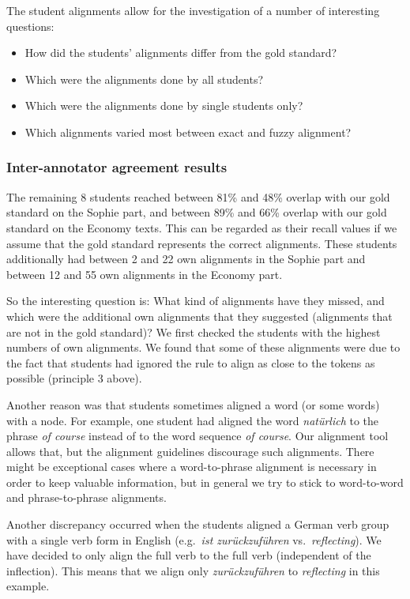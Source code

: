 \documentclass[output=paper]{LSP/langsci}
\begin{document}
The student alignments allow for the investigation of a number of interesting questions: 

\begin{itemize}
\item How did the students' alignments differ from the gold standard? 
\item Which were the alignments done by all students? 
\item Which were the alignments done by single students only? 
\item Which alignments varied most between exact and fuzzy alignment?
\end{itemize}

\subsubsection{Inter-annotator agreement results}\label{sec:volk:2.2.4}

The remaining 8 students reached between 81\% and 48\% overlap with our gold standard on the Sophie part, and between 89\% and 66\% overlap with our gold standard on the Economy texts. This can be regarded as their recall values if we assume that the gold standard represents the correct alignments. These students additionally had between 2 and 22 own alignments in the Sophie part and between 12 and 55 own alignments in the Economy part. 

So the interesting question is: What kind of alignments have they missed, and which were the additional own alignments that they suggested (alignments that are not in the gold standard)? We first checked the students with the highest numbers of own alignments. We found that some of these alignments were due to the fact that students had ignored the rule to align as close to the tokens as possible (principle 3 above). 

Another reason was that students sometimes aligned a word (or some words) with a node. For example, one student had aligned the word \textit{natürlich }to the phrase \textit{of course }instead of to the word sequence \textit{of course}. Our alignment tool allows that, but the alignment guidelines discourage such alignments. There might be exceptional cases where a word-to-phrase alignment is necessary in order to keep valuable information, but in general we try to stick to word-to-word and phrase-to-phrase alignments. 

Another discrepancy occurred when the students aligned a German verb group with a single verb form in English (e.g.~\textit{ist zurückzuführen }vs.~\textit{reflecting}). We have decided to only align the full verb to the full verb (independent of the inflection). This means that we align only \textit{zurückzuführen} to \textit{reflecting }in this example. 
\end{document}
